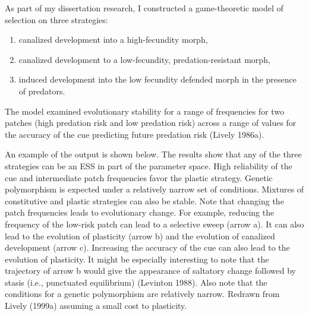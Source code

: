 \documentclass[
  letterpaper,
]{book}
\begin{document}
\begin{tcolorbox}[enhanced jigsaw, toprule=.15mm, rightrule=.15mm, arc=.35mm, titlerule=0mm, breakable, opacityback=0, leftrule=.75mm, bottomtitle=1mm, toptitle=1mm, title=\textcolor{quarto-callout-note-color}{\faInfo}\hspace{0.5em}{Box 3.1}, left=2mm, coltitle=black, colframe=quarto-callout-note-color-frame, colbacktitle=quarto-callout-note-color!10!white, bottomrule=.15mm, opacitybacktitle=0.6, colback=white]

As part of my dissertation research, I constructed a game-theoretic
model of selection on three strategies:

\begin{enumerate}
\def\labelenumi{\arabic{enumi}.}
\item
  canalized development into a high-fecundity morph,
\item
  canalized development to a low-fecundity, predation-resistant morph,
\item
  induced development into the low fecundity defended morph in the
  presence of predators.
\end{enumerate}

The model examined evolutionary stability for a range of frequencies for
two patches (high predation risk and low predation risk) across a range
of values for the accuracy of the cue predicting future predation risk
(Lively 1986a).

An example of the output is shown below. The results show that any of
the three strategies can be an ESS in part of the parameter
space.\footnotemark{} High reliability of the cue and intermediate patch
frequencies favor the plastic strategy. Genetic polymorphism is expected
under a relatively narrow set of conditions. Mixtures of constitutive
and plastic strategies can also be stable. Note that changing the patch
frequencies leads to evolutionary change. For example, reducing the
frequency of the low-risk patch can lead to a selective sweep (arrow a).
It can also lead to the evolution of plasticity (arrow b) and the
evolution of canalized development (arrow c). Increasing the accuracy of
the cue can also lead to the evolution of plasticity. It might be
especially interesting to note that the trajectory of arrow b would give
the appearance of saltatory change followed by stasis (i.e., punctuated
equilibrium) (Levinton 1988). Also note that the conditions for a
genetic polymorphism are relatively narrow. Redrawn from Lively (1999a)
assuming a small cost to plasticity.


\end{tcolorbox}
\end{document}

